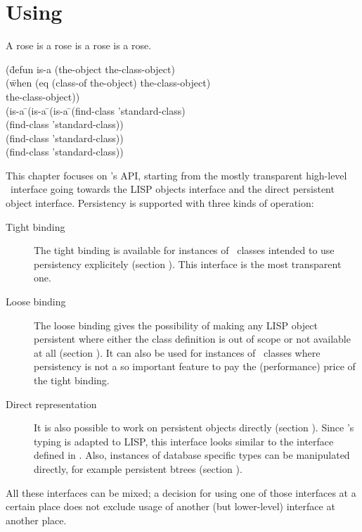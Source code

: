 %

\chapter[Using PLOB]%
{Using \protect\plob}
%
\begin{fortune}%
A rose is a rose is a rose is a rose.
\begin{tt}\CompactCodeSize\begin{tabbing}%
(d\={}efun is-a (the-object the-class-object)\\
  \>{}(w\={}hen (eq (class-of the-object) the-class-object)\\
  \>    \>{}the-class-object))\\[\smallskipamount]
(is-a \={}(is-a \={}(is-a \={}(find-class 'standard-class)\\
      \>{}      \>{}      \>{}(find-class 'standard-class))\\
      \>{}      \>{}(find-class 'standard-class))\\
      \>{}(find-class 'standard-class))
\end{tabbing}\end{tt}%
\fromwonl{\clos}%
\end{fortune}%
%
\ResetListener%
%  
\noindent{}This chapter focuses on \plobwoexcl's API, starting from the
mostly transparent high-level \clos\ interface going towards the LISP
objects interface and the direct persistent object interface.
Persistency is supported with three kinds of operation:
\begin{description}

\item[Tight binding] The tight binding is available for instances of
  \clos\ classes intended to use persistency explicitely
  (section ). This interface is the most
  transparent one.

\item[Loose binding] The loose binding gives the possibility of making
  any LISP object persistent where either the class definition is out
  of scope or not available at all
  (section ).  It can also be used for
  instances of \clos\ classes where persistency is not a so important
  feature to pay the (performance) price of the tight binding.

\item[Direct representation] It is also possible to work on persistent
  objects directly (section ).  Since
  \plobwoexcl's typing is adapted to LISP, this interface looks
  similar to the interface defined in \cite{bib:CLtLII}. Also,
  instances of database specific types can be manipulated
  directly, for example persistent btrees (section
  ).

\end{description}
All these interfaces can be mixed; a decision for using one of those
interfaces at a certain place does not exclude usage of another (but
lower-level) interface at another place.

